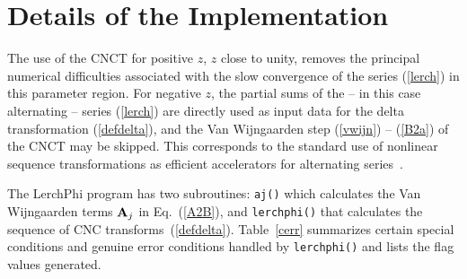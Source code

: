 \documentclass[11pt]{article}
\begin{document}
%
%
\section{Details of the Implementation}

The use of the CNCT for positive $z$, $z$ close to unity, removes
the principal numerical difficulties associated with the
slow convergence of the series (\ref{lerch}) in this parameter region.
For negative $z$, the partial sums of the -- in this case
alternating -- series (\ref{lerch}) are directly used as
input data for the delta transformation (\ref{defdelta}),
and the Van Wijngaarden step (\ref{vwijn}) -- (\ref{B2a})
of the CNCT may be skipped. This corresponds to the
standard use of nonlinear sequence transformations as efficient
accelerators for alternating series~\cite{We1989}.

The LerchPhi program has two subroutines: {\tt aj()} which calculates the Van 
Wijngaarden terms ${\bf A}_j$ in Eq.~(\ref{A2B}), and {\tt lerchphi()} that 
calculates the sequence of CNC transforms~(\ref{defdelta}).
Table~\ref{cerr} summarizes certain special conditions and genuine
error conditions handled by  {\tt lerchphi()} and lists the flag 
values generated.
\end{document}

